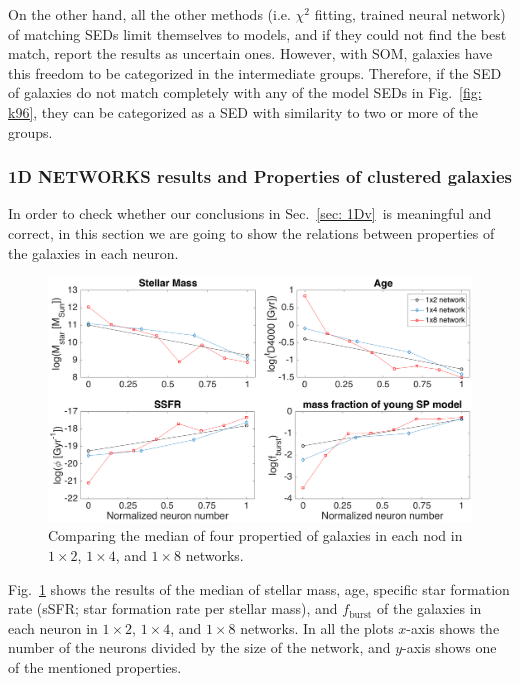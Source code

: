             On the other hand, all the other methods (i.e. $\chi^2$ fitting, trained neural network) of matching SEDs limit themselves to models, and if they could not find the best match, report the results as uncertain ones.
            However, with SOM, galaxies have this freedom to be categorized in the intermediate groups.
            Therefore, if the SED of galaxies do not match completely with any of the model SEDs in Fig.~\ref{fig: k96}, they can be categorized as a SED with similarity to two or more of the groups.

                        
        
        
        \subsubsection{1D NETWORKS results and Properties of clustered galaxies}
        
        In order to check whether our conclusions in Sec.~\ref{sec: 1Dv}~is meaningful and correct, in this section we are going to show the relations between properties of the galaxies in each neuron.
        
        \begin{figure}
            \centering
            \includegraphics[width=\textwidth]{../images0.01/1d/props5.png}
            \caption{Comparing the median of four propertied of galaxies in each nod in $1\times2$, $1\times4$, and $1\times8$ networks.}
            \label{fig: props}
        \end{figure}
       
        Fig.~\ref{fig: props} shows the results of the median of stellar mass, age, specific star formation rate (sSFR; star formation rate per stellar mass), and $f_\mathrm{burst}$ of the galaxies in each neuron in $1\times2$, $1\times4$, and $1\times8$ networks.
        In all the plots $x$-axis shows the number of the neurons divided by the size of the network, and $y$-axis shows one of the mentioned properties. %
        
